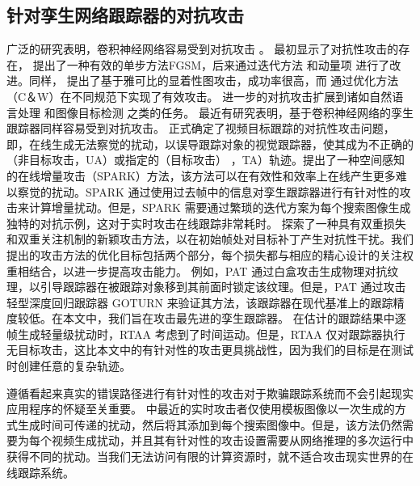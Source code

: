 \subsection{针对孪生网络跟踪器的对抗攻击}
广泛的研究表明，卷积神经网络容易受到对抗攻击 \cite{Deepsec}。\cite{intriguing} 最初显示了对抗性攻击的存在，\cite{FGSM} 提出了一种有效的单步方法FGSM，后来通过迭代方法 \cite{kurakin2017adversarial} 和动量项 \cite{dong2018boosting} 进行了改进。同样，\cite{papernot2016limitations} 提出了基于雅可比的显着性图攻击，成功率很高，而 \cite{carlini2017towards} 通过优化方法（C＆W）在不同规范下实现了有效攻击。 进一步的对抗攻击扩展到诸如自然语言处理 \cite{generating} 和图像目标检测 \cite{wei2019transferable}之类的任务。
最近有研究表明，基于卷积神经网络的孪生跟踪器同样容易受到对抗攻击。\cite{SPARK} 正式确定了视频目标跟踪的对抗性攻击问题，即，在线生成无法察觉的扰动，以误导跟踪对象的视觉跟踪器，使其成为不正确的（非目标攻击，UA）或指定的（目标攻击） ，TA）轨迹。提出了一种空间感知的在线增量攻击（SPARK）方法，该方法可以在有效性和效率上在线产生更多难以察觉的扰动。SPARK \cite{SPARK} 通过使用过去帧中的信息对孪生跟踪器进行有针对性的攻击来计算增量扰动。但是，SPARK 需要通过繁琐的迭代方案为每个搜索图像生成独特的对抗示例，这对于实时攻击在线跟踪非常耗时。\cite{chen2020one} 探索了一种具有双重损失和双重关注机制的新颖攻击方法，以在初始帧处对目标补丁产生对抗性干扰。我们提出的攻击方法的优化目标包括两个部分，每个损失都与相应的精心设计的关注权重相结合，以进一步提高攻击能力。
例如，PAT \cite{PAT} 通过白盒攻击生成物理对抗纹理，以引导跟踪器在被跟踪对象移到其前面时锁定该纹理。但是，PAT 通过攻击轻型深度回归跟踪器 GOTURN \cite{GOTURN} 来验证其方法，该跟踪器在现代基准上的跟踪精度较低。在本文中，我们旨在攻击最先进的孪生跟踪器。
在估计的跟踪结果中逐帧生成轻量级扰动时，RTAA \cite{RTAA} 考虑到了时间运动。但是，RTAA 仅对跟踪器执行无目标攻击，这比本文中的有针对性的攻击更具挑战性，因为我们的目标是在测试时创建任意的复杂轨迹。

遵循看起来真实的错误路径进行有针对性的攻击对于欺骗跟踪系统而不会引起现实应用程序的怀疑至关重要。
\cite{TTP} 中最近的实时攻击者仅使用模板图像以一次生成的方式生成时间可传递的扰动，然后将其添加到每个搜索图像中。但是，该方法仍然需要为每个视频生成扰动，并且其有针对性的攻击设置需要从网络推理的多次运行中获得不同的扰动。当我们无法访问有限的计算资源时，就不适合攻击现实世界的在线跟踪系统。

